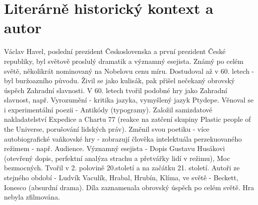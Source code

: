 \documentclass[11pt]{article}
\begin{document}
    \section*{Literárně historický kontext a autor}
    Václav Havel, poslední prezident Československa a první prezident České republiky, byl světově proslulý dramatik a významný esejista.
    Známý po celém světě, několikrát nominovaný na Nobelovu cenu míru.
    Dostudoval až v 60. letech - byl buržoazního původu.
    Živil se jako kulisák, pak přišel nečekaný obrovský úspěch Zahradní slavnosti.
    V 60. letech tvořil podobné hry jako Zahradní slavnost, např. Vyrozumění - kritika jazyka, vymyšlený jazyk Ptydepe. Věnoval se i experimentální poezii - Antikódy (typogramy).
    Založil samizdatové nakladatelství Expedice a Chartu 77 (reakce na zatčení skupiny Plastic people of the Universe, porušování lidských práv).
    Změnil svou poetiku - více autobiografické vaňkovské hry - zobrazují člověka intelektuála perzekuovaného režimem - např. Audience.
    Významný esejista - Dopis Gustavu Husákovi (otevřený dopis, perfektní analýza strachu a přetvářky lidí v režimu), Moc bezmocných.
    Tvořil v 2. polovině 20.století a na začátku 21. století.
    Autoři ze stejného období - Ludvík Vaculík, Hrabal, Hrubín, Klíma, ve světě - Beckett, Ionesco (absurdní drama).
    Díla zaznamenala obrovský úspěch po celém světě. Hra nebyla zfilmována.
\end{document}
